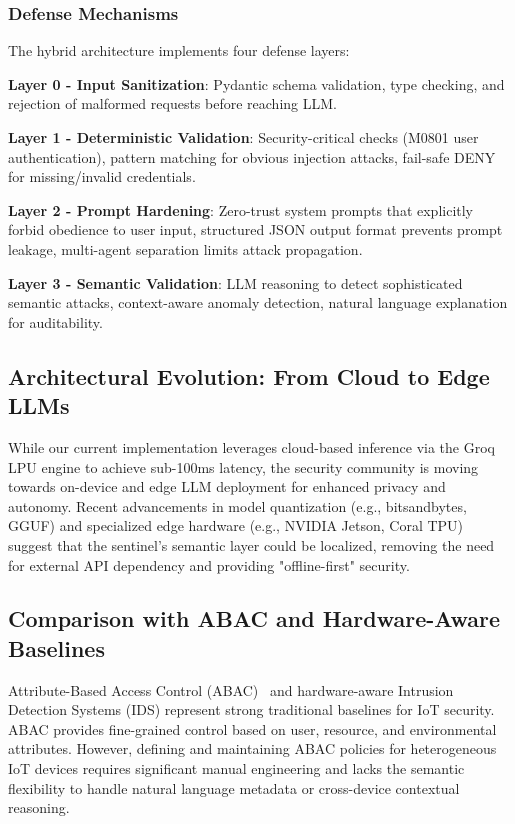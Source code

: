 \documentclass[conference]{IEEEtran}
\begin{document}
\subsubsection{Defense Mechanisms}

The hybrid architecture implements four defense layers:

\textbf{Layer 0 - Input Sanitization}: Pydantic schema validation, type checking, and rejection of malformed requests before reaching LLM.

\textbf{Layer 1 - Deterministic Validation}: Security-critical checks (M0801 user authentication), pattern matching for obvious injection attacks, fail-safe DENY for missing/invalid credentials.

\textbf{Layer 2 - Prompt Hardening}: Zero-trust system prompts that explicitly forbid obedience to user input, structured JSON output format prevents prompt leakage, multi-agent separation limits attack propagation.

\textbf{Layer 3 - Semantic Validation}: LLM reasoning to detect sophisticated semantic attacks, context-aware anomaly detection, natural language explanation for auditability.

\subsection{Architectural Evolution: From Cloud to Edge LLMs}

While our current implementation leverages cloud-based inference via the Groq LPU engine to achieve sub-100ms latency, the security community is moving towards on-device and edge LLM deployment for enhanced privacy and autonomy. Recent advancements in model quantization (e.g., bitsandbytes, GGUF) and specialized edge hardware (e.g., NVIDIA Jetson, Coral TPU) suggest that the sentinel's semantic layer could be localized, removing the need for external API dependency and providing "offline-first" security.

\subsection{Comparison with ABAC and Hardware-Aware Baselines}

Attribute-Based Access Control (ABAC)~\cite{abac2012} and hardware-aware Intrusion Detection Systems (IDS) represent strong traditional baselines for IoT security. ABAC provides fine-grained control based on user, resource, and environmental attributes. However, defining and maintaining ABAC policies for heterogeneous IoT devices requires significant manual engineering and lacks the semantic flexibility to handle natural language metadata or cross-device contextual reasoning.
\end{document}

